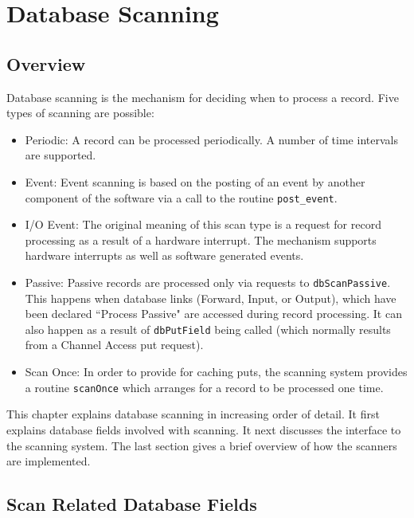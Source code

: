 \chapter{Database Scanning}

\section{Overview}

Database scanning is the mechanism for deciding when to process a record.
Five types of scanning are possible:

\begin{itemize}
\item {}Periodic: A record can be processed periodically.
A number of time intervals are supported.

\item {}Event: Event scanning is based on the posting of an event by another component of the software via a call to the routine \verb|post_event|.

\item {}I/O Event: The original meaning of this scan type is a request for record processing as a result of a hardware interrupt.
The mechanism supports hardware interrupts as well as software generated events.

\item {}Passive: Passive records are processed only via requests to \verb|dbScanPassive|.
This happens when database links (Forward, Input, or Output), which have been declared ``Process Passive" are accessed during record processing.
It can also happen as a result of \verb|dbPutField| being called (which normally results from a Channel Access put request).

\item {}Scan Once: In order to provide for caching puts, the scanning system provides a routine \verb|scanOnce| which arranges for a record to be processed one time.

\end{itemize}

This chapter explains database scanning in increasing order of detail.
It first explains database fields involved with scanning.
It next discusses the interface to the scanning system.
The last section gives a brief overview of how the scanners are implemented.

\section{Scan Related Database Fields}

